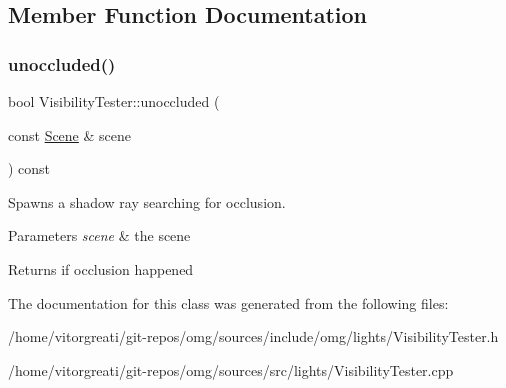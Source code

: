 \subsection{Member Function Documentation}
\mbox{\label{classomg_1_1_visibility_tester_ac2f4eda3866795981b48f4db367255ac}} 
\subsubsection{\texorpdfstring{unoccluded()}{unoccluded()}}
{\footnotesize\ttfamily bool Visibility\+Tester\+::unoccluded (\begin{DoxyParamCaption}\item[{const \mbox{\hyperlink{classomg_1_1_scene}{Scene}} \&}]{scene }\end{DoxyParamCaption}) const}



Spawns a shadow ray searching for occlusion. 


\begin{DoxyParams}{Parameters}
{\em scene} & the scene \\
\hline
\end{DoxyParams}
\begin{DoxyReturn}{Returns}
if occlusion happened 
\end{DoxyReturn}


The documentation for this class was generated from the following files\+:\begin{DoxyCompactItemize}
\item 
/home/vitorgreati/git-\/repos/omg/sources/include/omg/lights/Visibility\+Tester.\+h\item 
/home/vitorgreati/git-\/repos/omg/sources/src/lights/Visibility\+Tester.\+cpp\end{DoxyCompactItemize}
